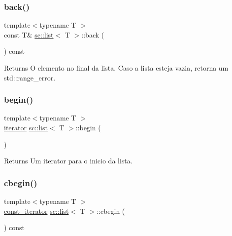 \subsubsection{\texorpdfstring{back()}{back()}}
{\footnotesize\ttfamily template$<$typename T $>$ \\
const T\& \hyperlink{classsc_1_1list}{sc\+::list}$<$ T $>$\+::back (\begin{DoxyParamCaption}{ }\end{DoxyParamCaption}) const\hspace{0.3cm}{\ttfamily [inline]}}

\begin{DoxyReturn}{Returns}
O elemento no final da lista. Caso a lista esteja vazia, retorna um std\+::range\+\_\+error. 
\end{DoxyReturn}
\mbox{\label{classsc_1_1list_a2fa015e137583d7142933500b34f1e29}} 
\subsubsection{\texorpdfstring{begin()}{begin()}}
{\footnotesize\ttfamily template$<$typename T $>$ \\
\hyperlink{classsc_1_1list_1_1iterator}{iterator} \hyperlink{classsc_1_1list}{sc\+::list}$<$ T $>$\+::begin (\begin{DoxyParamCaption}{ }\end{DoxyParamCaption})\hspace{0.3cm}{\ttfamily [inline]}}

\begin{DoxyReturn}{Returns}
Um iterator para o inicio da lista. 
\end{DoxyReturn}
\mbox{\label{classsc_1_1list_ab128f2a6caa171927474485d9d2f05fc}} 
\subsubsection{\texorpdfstring{cbegin()}{cbegin()}}
{\footnotesize\ttfamily template$<$typename T $>$ \\
\hyperlink{classsc_1_1list_1_1const__iterator}{const\+\_\+iterator} \hyperlink{classsc_1_1list}{sc\+::list}$<$ T $>$\+::cbegin (\begin{DoxyParamCaption}{ }\end{DoxyParamCaption}) const\hspace{0.3cm}{\ttfamily [inline]}}

